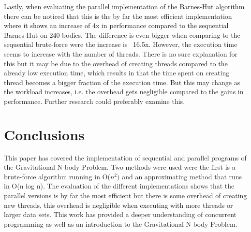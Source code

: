 \documentclass{article}
\begin{document}
Lastly, when evaluating the parallel implementation of the Barnes-Hut algorithm there can be noticed that this is the by far the most efficient implementation where it shows an increase of 4x in performance compared to the sequential Barnes-Hut on 240 bodies. The difference is even bigger when comparing to the sequential brute-force were the increase is ~16,5x. However, the execution time seems to increase with the number of threads. There is no sure explanation for this but it may be due to the overhead of creating threads compared to the already low execution time, which results in that the time spent on creating thread becomes a bigger fraction of the execution time. But this may change as the workload increases, i.e. the overhead gets negligible compared to the gains in performance. Further research could preferably examine this. 



\section{Conclusions}

This paper has covered the implementation of sequential and parallel programs of the Gravitational N-body Problem. Two methods were used were the first is a brute-force algorithm running in O(\(n^2)\) and an approximating method that runs in O(n log n). The evaluation of the different implementations shows that the parallel versions is by far the most efficient but there is some overhead of creating new threads, this overhead is negligible when executing with more threads or larger data sets. This work has provided a deeper understanding of concurrent programming as well as an introduction to the Gravitational N-body Problem. 
\end{document}
